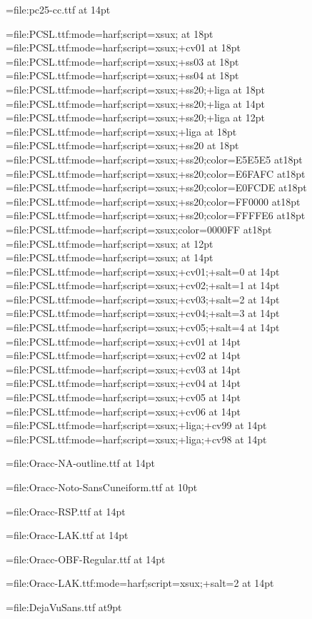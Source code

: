 \font\pccc={file:pc25-cc.ttf} at 14pt

\font\pcxxv={file:PCSL.ttf:mode=harf;script=xsux;} at 18pt
\font\pccvi={file:PCSL.ttf:mode=harf;script=xsux;+cv01} at 18pt
\font\pcssiii={file:PCSL.ttf:mode=harf;script=xsux;+ss03} at 18pt
\font\pcssiv={file:PCSL.ttf:mode=harf;script=xsux;+ss04} at 18pt
\font\pcssXX={file:PCSL.ttf:mode=harf;script=xsux;+ss20;+liga} at 18pt
\font\pcssxx={file:PCSL.ttf:mode=harf;script=xsux;+ss20;+liga} at 14pt
\font\pcssxxx={file:PCSL.ttf:mode=harf;script=xsux;+ss20;+liga} at 12pt
\font\pcxviii={file:PCSL.ttf:mode=harf;script=xsux;+liga} at 18pt
\font\pcssxx={file:PCSL.ttf:mode=harf;script=xsux;+ss20} at 18pt
\font\pceee={file:PCSL.ttf:mode=harf;script=xsux;+ss20;color=E5E5E5} at18pt
\font\pceff={file:PCSL.ttf:mode=harf;script=xsux;+ss20;color=E6FAFC} at18pt
\font\pcefd={file:PCSL.ttf:mode=harf;script=xsux;+ss20;color=E0FCDE} at18pt
\font\pcfee={file:PCSL.ttf:mode=harf;script=xsux;+ss20;color=FF0000} at18pt
\font\pcffe={file:PCSL.ttf:mode=harf;script=xsux;+ss20;color=FFFFE6} at18pt
\font\pcblu={file:PCSL.ttf:mode=harf;script=xsux;color=0000FF} at18pt
\font\pcringop={file:PCSL.ttf:mode=harf;script=xsux;} at 12pt
\font\pcseq={file:PCSL.ttf:mode=harf;script=xsux;} at 14pt
\font\pcseqi={file:PCSL.ttf:mode=harf;script=xsux;+cv01;+salt=0} at 14pt
\font\pcseqii={file:PCSL.ttf:mode=harf;script=xsux;+cv02;+salt=1} at 14pt
\font\pcseqiii={file:PCSL.ttf:mode=harf;script=xsux;+cv03;+salt=2} at 14pt
\font\pcseqiv={file:PCSL.ttf:mode=harf;script=xsux;+cv04;+salt=3} at 14pt
\font\pcseqv={file:PCSL.ttf:mode=harf;script=xsux;+cv05;+salt=4} at 14pt
\font\pccvi={file:PCSL.ttf:mode=harf;script=xsux;+cv01} at 14pt
\font\pccvii={file:PCSL.ttf:mode=harf;script=xsux;+cv02} at 14pt
\font\pccviii={file:PCSL.ttf:mode=harf;script=xsux;+cv03} at 14pt
\font\pccviv={file:PCSL.ttf:mode=harf;script=xsux;+cv04} at 14pt
\font\pccvv={file:PCSL.ttf:mode=harf;script=xsux;+cv05} at 14pt
\font\pccvvi={file:PCSL.ttf:mode=harf;script=xsux;+cv06} at 14pt
\font\pccvxcix={file:PCSL.ttf:mode=harf;script=xsux;+liga;+cv99} at 14pt
\font\pccvxcviii={file:PCSL.ttf:mode=harf;script=xsux;+liga;+cv98} at 14pt

\font\oraccnao={file:Oracc-NA-outline.ttf} at 14pt

\font\oraccnoto={file:Oracc-Noto-SansCuneiform.ttf} at 10pt

\font\oraccrsp={file:Oracc-RSP.ttf} at 14pt

\font\oracclak={file:Oracc-LAK.ttf} at 14pt

\font\oraccobf={file:Oracc-OBF-Regular.ttf} at 14pt

\font\oracclaksaltiii={file:Oracc-LAK.ttf:mode=harf;script=xsux;+salt=2} at 14pt

\let\oraccpc\pcseq

\font\gdistfont={file:DejaVuSans.ttf} at9pt

\endinput
